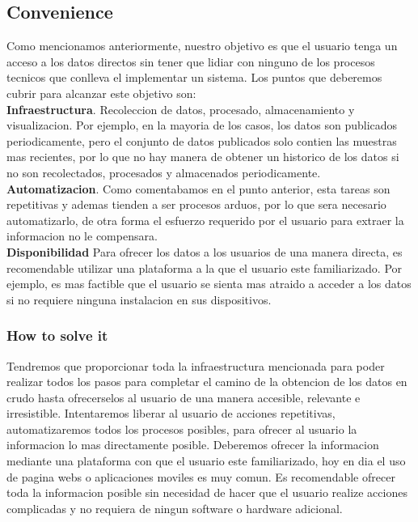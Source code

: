 \subsection{Convenience}
Como mencionamos anteriormente, nuestro objetivo es que el usuario tenga un acceso a los datos directos sin tener que lidiar con ninguno
de los procesos tecnicos que conlleva el implementar un sistema. Los puntos que deberemos cubrir para alcanzar este objetivo son:\\

\textbf{Infraestructura}. Recoleccion de datos, procesado, almacenamiento y visualizacion. Por ejemplo, en la mayoria de los casos, los datos son 
publicados periodicamente, pero el conjunto de datos publicados solo contien las muestras mas recientes, por lo que no hay manera de obtener 
un historico de los datos si no son recolectados, procesados y almacenados periodicamente. \\

\textbf{Automatizacion}. Como comentabamos en el punto anterior, esta tareas son repetitivas y ademas tienden a ser procesos arduos, por lo que sera
necesario automatizarlo, de otra forma el esfuerzo requerido por el usuario para extraer la informacion no le compensara. \\

\textbf{Disponibilidad} Para ofrecer los datos a los usuarios de una manera directa, es recomendable utilizar una plataforma a la que el usuario
este familiarizado. Por ejemplo, es mas factible que el usuario se sienta mas atraido a acceder a los datos si no requiere
ninguna instalacion en sus dispositivos.\\

\subsubsection{How to solve it} 
Tendremos que proporcionar toda la infraestructura mencionada para poder realizar todos los pasos para completar el camino de la obtencion de los
datos en crudo hasta ofrecerselos al usuario de una manera accesible, relevante e irresistible.
Intentaremos liberar al usuario de acciones repetitivas, automatizaremos todos los procesos posibles, para ofrecer al usuario la informacion lo mas
directamente posible.
Deberemos ofrecer la informacion mediante una plataforma con que el usuario este familiarizado, hoy en dia el uso de pagina webs o aplicaciones moviles es muy comun.
Es recomendable ofrecer toda la informacion posible sin necesidad de hacer que el usuario realize acciones complicadas y no requiera de ningun software o hardware adicional.


